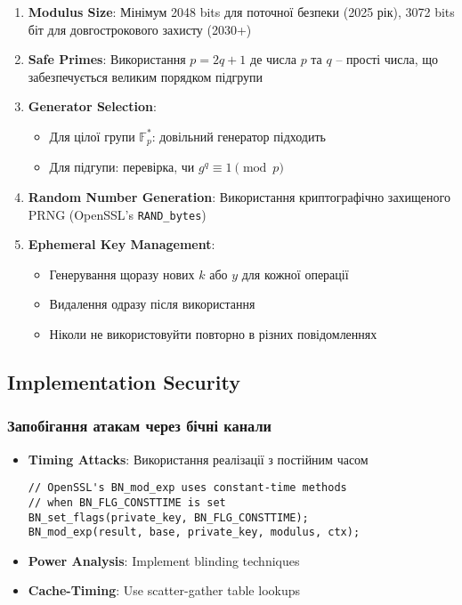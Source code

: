 \begin{enumerate}
    \item \textbf{Modulus Size}: Мінімум 2048 bits для поточної безпеки (2025 рік), 3072 bits біт для довгострокового захисту (2030+)~\cite{barker2020recommendation}

    \item \textbf{Safe Primes}: Використання $p = 2q + 1$ де числа $p$ та $q$ -- прості числа, що забезпечується великим порядком підгрупи

    \item \textbf{Generator Selection}:
          \begin{itemize}
              \item Для цілої групи $\mathbb{F}_p^*$: довільний генератор підходить
              \item Для підгупи: перевірка, чи $g^q \equiv 1 \pmod{p}$
          \end{itemize}

    \item \textbf{Random Number Generation}: Використання криптографічно захищеного PRNG (OpenSSL's \texttt{RAND\_bytes})

    \item \textbf{Ephemeral Key Management}:
          \begin{itemize}
              \item Генерування щоразу нових $k$ або $y$ для кожної операції
              \item Видалення одразу після використання
              \item Ніколи не використовуйти повторно в різних повідомленнях
          \end{itemize}
\end{enumerate}

\subsection{Implementation Security}

\subsubsection{Запобігання атакам через бічні канали}

\begin{itemize}
    \item \textbf{Timing Attacks}: Використання реалізації з постійним часом
          \begin{verbatim}
// OpenSSL's BN_mod_exp uses constant-time methods
// when BN_FLG_CONSTTIME is set
BN_set_flags(private_key, BN_FLG_CONSTTIME);
BN_mod_exp(result, base, private_key, modulus, ctx);
    \end{verbatim}

    \item \textbf{Power Analysis}: Implement blinding techniques
    \item \textbf{Cache-Timing}: Use scatter-gather table lookups
\end{itemize}

